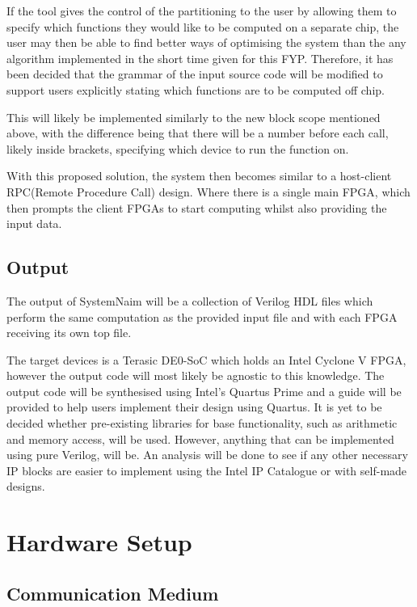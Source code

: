 If the tool gives the control of the partitioning to the user by allowing them to specify which functions they would like to be computed on a separate chip, the user may then be able to find better ways of optimising the system than the any algorithm implemented in the short time given for this FYP. Therefore, it has been decided that the grammar of the input source code will be modified to support users explicitly stating which functions are to be computed off chip.

This will likely be implemented similarly to the new block scope mentioned above, with the difference being that there will be a number before each call, likely inside brackets, specifying which device to run the function on.

With this proposed solution, the system then becomes similar to a host-client RPC(Remote Procedure Call) design. Where there is a single main FPGA, which then prompts the client FPGAs to start computing whilst also providing the input data.

\subsection{Output}

The output of SystemNaim will be a collection of Verilog HDL files which perform the same computation as the provided input file and with each FPGA receiving its own top file.

The target devices is a Terasic DE0-SoC which holds an Intel Cyclone V FPGA, however the output code will most likely be agnostic to this knowledge. The output code will be synthesised using Intel's Quartus Prime and a guide will be provided to help users implement their design using Quartus. It is yet to be decided whether pre-existing libraries for base functionality, such as arithmetic and memory access, will be used. However, anything that can be implemented using pure Verilog, will be. An analysis will be done to see if any other necessary IP blocks are easier to implement using the Intel IP Catalogue or with self-made designs.

\section{Hardware Setup}

\subsection{Communication Medium}

